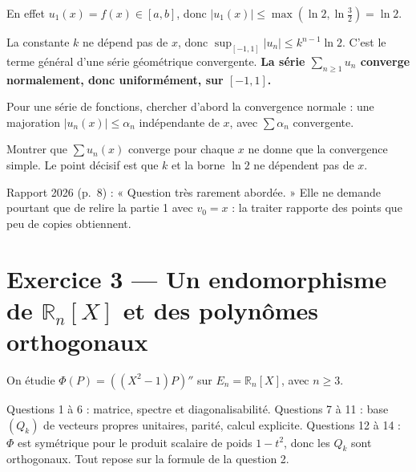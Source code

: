 \documentclass[11pt,a4paper]{article}
\begin{document}
En effet \(u_1(x)=f(x)\in[a,b]\), donc \(|u_1(x)|\le\max(\ln2,\ln\frac32)=\ln2\).

La constante \(k\) ne dépend pas de \(x\), donc \(\sup_{[-1,1]}|u_n|\le k^{n-1}\ln2\). C'est le terme général d'une série géométrique convergente. \textbf{La série \(\sum_{n\ge1}u_n\) converge normalement, donc uniformément, sur \([-1,1]\).}

\begin{methode}

Pour une série de fonctions, chercher d'abord la convergence normale : une majoration \(|u_n(x)|\le\alpha_n\) indépendante de \(x\), avec \(\sum\alpha_n\) convergente.

\end{methode}

\begin{piege}

Montrer que \(\sum u_n(x)\) converge pour chaque \(x\) ne donne que la convergence simple. Le point décisif est que \(k\) et la borne \(\ln2\) ne dépendent pas de \(x\).

\end{piege}

\begin{jury}

Rapport 2026 (p.~8) : « Question très rarement abordée. » Elle ne demande pourtant que de relire la partie 1 avec \(v_0=x\) : la traiter rapporte des points que peu de copies obtiennent.

\end{jury}

\hypertarget{exercice-3-un-endomorphisme-de-mathbb-r_nx-et-des-polynuxf4mes-orthogonaux}{%
\section{\texorpdfstring{Exercice 3 --- Un endomorphisme de \(\mathbb R_n[X]\) et des polynômes orthogonaux}{Exercice 3 --- Un endomorphisme de \textbackslash mathbb R\_n{[}X{]} et des polynômes orthogonaux}}\label{exercice-3-un-endomorphisme-de-mathbb-r_nx-et-des-polynuxf4mes-orthogonaux}}

On étudie \(\Phi(P)=((X^2-1)P)''\) sur \(E_n=\mathbb R_n[X]\), avec \(n\ge3\).

Questions 1 à 6 : matrice, spectre et diagonalisabilité. Questions 7 à 11 : base \((Q_k)\) de vecteurs propres unitaires, parité, calcul explicite. Questions 12 à 14 : \(\Phi\) est symétrique pour le produit scalaire de poids \(1-t^2\), donc les \(Q_k\) sont orthogonaux. Tout repose sur la formule de la question 2.
\end{document}
